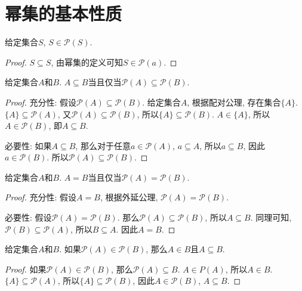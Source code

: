 \section{幂集的基本性质}
\begin{proposition}
	给定集合$S$, $S\in \mathscr P(S)$.
\end{proposition}

\begin{proof}
	$S\subseteq S$, 由幂集的定义可知$S\in \mathscr P(a)$.
\end{proof}

\begin{proposition}
	给定集合$A$和$B$. $A\subseteq B$当且仅当$\mathscr P(A)\subseteq \mathscr P(B)$.
\end{proposition}

\begin{proof}
	充分性: 假设$\mathscr P(A)\subseteq \mathscr P(B)$. 给定集合$A$, 根据配对公理, 存在集合$\{A\}$. $\{A\}\subseteq \mathscr P(A)$, 又$\mathscr P(A)\subseteq \mathscr P(B)$, 所以$\{A\}\subseteq \mathscr P(B)$. $A\in \{A\}$, 所以$A\in \mathscr P(B)$, 即$A\subseteq B$.

	必要性: 如果$A\subseteq B$, 那么对于任意$a\in \mathscr P(A)$, $a\subseteq A$, 所以$a\subseteq B$, 因此$a\in \mathscr P(B)$. 所以$\mathscr P(A)\subseteq \mathscr P(B)$.
\end{proof}

\begin{proposition}
	给定集合$A$和$B$. $A=B$当且仅当$\mathscr P(A)=\mathscr P(B)$.
\end{proposition}

\begin{proof}
	充分性: 假设$A=B$, 根据外延公理, $\mathscr P(A)=\mathscr P(B)$.

	必要性: 假设$\mathscr P(A)=\mathscr P(B)$. 那么$\mathscr P(A)\subseteq \mathscr P(B)$, 所以$A\subseteq B$. 同理可知, $\mathscr P(B)\subseteq \mathscr P(A)$, 所以$B\subseteq A$. 因此$A=B$.
\end{proof}

\begin{proposition}
	给定集合$A$和$B$. 如果$\mathscr P(A)\in \mathscr P(B)$, 那么$A\in B$且$A\subseteq B$.
\end{proposition}

\begin{proof}
	如果$\mathscr P(A)\in \mathscr P(B)$, 那么$\mathscr P(A)\subseteq B$. $A\in P(A)$, 所以$A\in B$. $\{A\}\subseteq \mathscr P(A)$, 所以$\{A\}\subseteq \mathscr P(B)$, 因此$A\in \mathscr P(B)$, $A\subseteq B$.
\end{proof}

